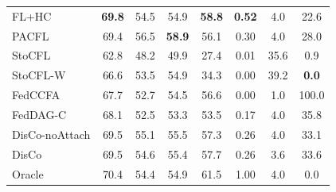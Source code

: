 \begin{tabular}{lccccccc}
FL+HC & \textbf{69.8} & 54.5 & 54.9 & \textbf{58.8} & \textbf{0.52} & 4.0 & 22.6 \\
PACFL & 69.4 & 56.5 & \textbf{58.9} & 56.1 & 0.30 & 4.0 & 28.0 \\
StoCFL & 62.8 & 48.2 & 49.9 & 27.4 & 0.01 & 35.6 & 0.9 \\
StoCFL-W & 66.6 & 53.5 & 54.9 & 34.3 & 0.00 & 39.2 & \textbf{0.0} \\
FedCCFA & 67.7 & 52.7 & 54.5 & 56.6 & 0.00 & 1.0 & 100.0 \\
FedDAG-C & 68.1 & 52.5 & 53.3 & 53.5 & 0.17 & 4.0 & 35.8 \\
DisCo-noAttach & 69.5 & 55.1 & 55.5 & 57.3 & 0.26 & 4.0 & 33.1 \\
DisCo & 69.5 & 54.6 & 55.4 & 57.7 & 0.26 & 3.6 & 33.6 \\
Oracle & 70.4 & 54.4 & 54.9 & 61.5 & 1.00 & 4.0 & 0.0 \\
\bottomrule
\end{tabular}
